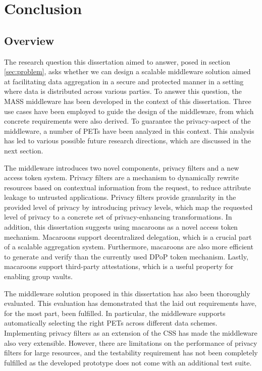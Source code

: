 \chapter{Conclusion}
\label{cha:conclusion}
\section{Overview}
The research question this dissertation aimed to answer, posed in section \ref{sec:problem}, asks whether we can design a scalable middleware solution aimed at facilitating data aggregation in a secure and protected manner in a setting where data is distributed across various parties. To answer this question, the MASS middleware has been developed in the context of this dissertation. Three use cases have been employed to guide the design of the middleware, from which concrete requirements were also derived.  To guarantee the privacy-aspect of the middleware, a number of \acrlong{PETs} have been analyzed in this context. This analysis has led to various possible future research directions, which are discussed in the next section.

The middleware introduces two novel components, privacy filters and a new access token system. Privacy filters are a mechanism to dynamically rewrite resources based on contextual information from the request, to reduce attribute leakage to untrusted applications. Privacy filters provide granularity in the provided level of privacy by introducing privacy levels, which map the requested level of privacy to a concrete set of privacy-enhancing transformations. In addition, this dissertation suggests using macaroons as a novel access token mechanism. Macaroons support decentralized delegation, which is a crucial part of a scalable aggregation system. Furthermore, macaroons are also more efficient to generate and verify than the currently used \gls{DPoP} token mechanism. Lastly, macaroons support third-party attestations, which is a useful property for enabling group vaults.

The middleware solution proposed in this dissertation has also been thoroughly evaluated. This evaluation has demonstrated that the laid out requirements have, for the most part, been fulfilled. In particular, the middleware supports automatically selecting the right \gls{PETs} across different data schemes. Implementing privacy filters as an extension of the \gls{CSS} has made the middleware also very extensible. However, there are limitations on the performance of privacy filters for large resources, and the testability requirement has not been completely fulfilled as the developed prototype does not come with an additional test suite. 

